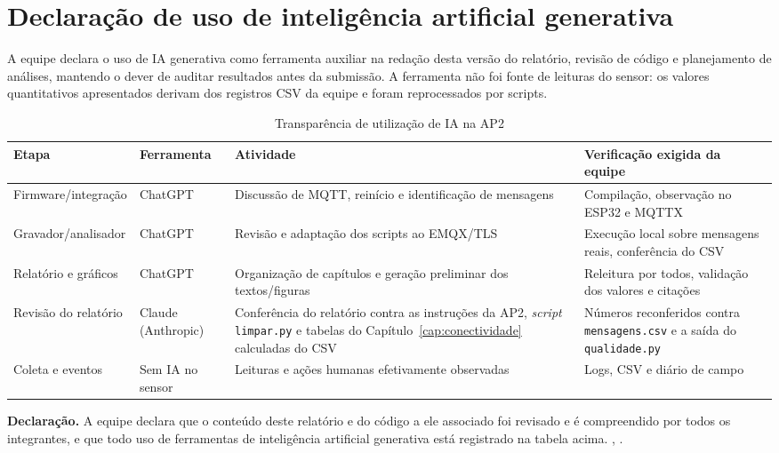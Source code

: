 \chapter{Declaração de uso de inteligência artificial generativa}\label{ap:ia}
A equipe declara o uso de IA generativa como ferramenta auxiliar na redação desta versão do relatório, revisão de código e planejamento de análises, mantendo o dever de auditar resultados antes da submissão. A ferramenta não foi fonte de leituras do sensor: os valores quantitativos apresentados derivam dos registros CSV da equipe e foram reprocessados por scripts.
\begin{table}[H]\centering\caption{Transparência de utilização de IA na AP2}\label{tab:ia}\footnotesize
\begin{tabular}{@{}L{3.2cm}L{2.7cm}L{4.6cm}L{4.3cm}@{}}\toprule
\textbf{Etapa}&\textbf{Ferramenta}&\textbf{Atividade}&\textbf{Verificação exigida da equipe}\\\midrule
Firmware/integração&ChatGPT&Discussão de MQTT, reinício e identificação de mensagens&Compilação, observação no ESP32 e MQTTX\\
Gravador/analisador&ChatGPT&Revisão e adaptação dos scripts ao EMQX/TLS&Execução local sobre mensagens reais, conferência do CSV\\
Relatório e gráficos&ChatGPT&Organização de capítulos e geração preliminar dos textos/figuras&Releitura por todos, validação dos valores e citações\\
Revisão do relatório&Claude (Anthropic)&Conferência do relatório contra as instruções da AP2, \emph{script} \texttt{limpar.py} e tabelas do Capítulo~\ref{cap:conectividade} calculadas do CSV&Números reconferidos contra \texttt{mensagens.csv} e a saída do \texttt{qualidade.py}\\
Coleta e eventos&Sem IA no sensor&Leituras e ações humanas efetivamente observadas&Logs, CSV e diário de campo\\
\bottomrule\end{tabular}\end{table}
\noindent\textbf{Declaração.} A equipe declara que o conteúdo deste relatório e do código a ele associado foi revisado e é compreendido por todos os integrantes, e que todo uso de ferramentas de inteligência artificial generativa está registrado na tabela acima.
\vspace{0.6cm}
\imprimirTabelaIntegrantes
\vspace{0.6cm}
\noindent\localEntrega, \dataEntrega.
